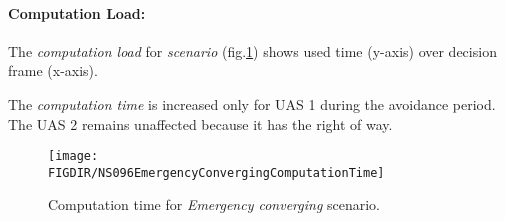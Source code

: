 \paragraph{Computation Load:} The \emph{computation load} for \emph{scenario} (fig.\ref{fig:emergencyConvergingComputationTime}) shows used time (y-axis) over decision frame (x-axis).

The \emph{computation time} is increased only for UAS 1 during the avoidance period. The UAS 2 remains unaffected because it has the right of way.

\begin{figure}[H]
    \centering
    \texttt{[image: \\FIGDIR/NS096EmergencyConvergingComputationTime]} 
    \caption{Computation time for \emph{Emergency converging} scenario.}
    \label{fig:emergencyConvergingComputationTime}
\end{figure}

